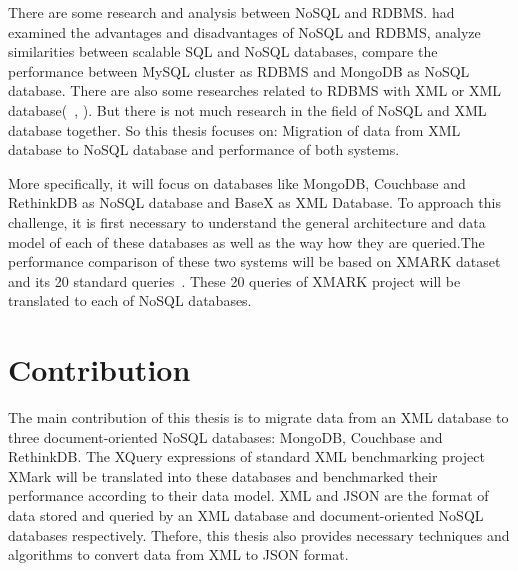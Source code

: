 	\par		
	There are some research and analysis between NoSQL and RDBMS. \citet{nance2013nosql} had examined the advantages and disadvantages of NoSQL and RDBMS, \cite{cattell2011scalable} analyze similarities between scalable SQL and NoSQL databases, \cite{hadjigeorgiou2013rdbms}  compare the performance between MySQL cluster as RDBMS and MongoDB as NoSQL database.  There are also some researches related to RDBMS with XML or XML database(~\citet{jiang2002xparent}, \citet{shanmugasundaram1999relational}). But there is not much research in the field of NoSQL and XML database together. So this thesis focuses on: Migration of data from XML database to NoSQL database and  performance of both systems.	

\par 
More specifically, it will focus on databases like MongoDB, Couchbase and RethinkDB as NoSQL database and BaseX as XML Database. To approach this challenge, it is first necessary to understand the general architecture and data model of each of these databases as well as the way how they are queried.The performance comparison of these two systems will be based on XMARK dataset and its 20 standard queries~\citep{xmark/original}. These 20 queries of XMARK project will be translated to each of NoSQL databases.
	
	\section{Contribution}
		The main contribution of this thesis is to migrate data from an XML database to three document-oriented  NoSQL databases: MongoDB, Couchbase and RethinkDB. The XQuery expressions of standard XML benchmarking project XMark will be  translated  into these databases and benchmarked their performance according to their data model. XML and JSON are the format of data stored and queried by an XML database and document-oriented NoSQL databases respectively. Thefore, this thesis also provides necessary techniques and algorithms to convert data from XML to JSON format.
	    
		
